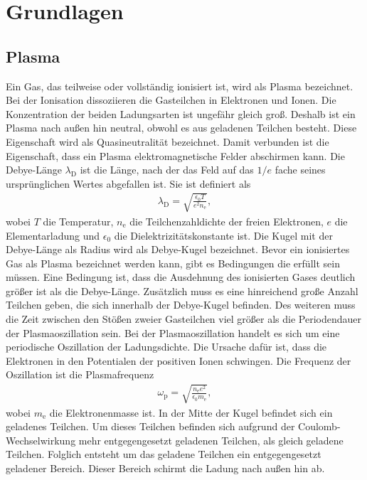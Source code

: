 \section{Grundlagen}
\subsection{Plasma}\label{sec:plasma}
Ein Gas, das teilweise oder vollständig ionisiert ist, wird als Plasma \cite{Plasmaphysik} bezeichnet. Bei der Ionisation dissoziieren die Gasteilchen in Elektronen und Ionen. Die Konzentration der beiden Ladungsarten ist ungefähr gleich groß. Deshalb ist ein Plasma nach außen hin neutral, obwohl es aus geladenen Teilchen besteht. Diese Eigenschaft wird als Quasineutralität bezeichnet. Damit verbunden ist die Eigenschaft, dass ein Plasma elektromagnetische Felder abschirmen kann.
Die Debye-Länge $\lambda_{\mathrm{D}}$ ist die Länge, nach der das Feld auf das $1/e$ fache seines ursprünglichen Wertes abgefallen ist. Sie ist definiert als
\begin{align}
\lambda_{\mathrm{D}}=\sqrt{\frac{\epsilon_0 T}{e^2 n_\mathrm{e}}},
\end{align}
wobei $T$ die Temperatur, $n_\mathrm{e}$ die Teilchenzahldichte der freien Elektronen, $e$ die Elementarladung und $\epsilon_0$ die Dielektrizitätskonstante ist.
Die Kugel mit der Debye-Länge als Radius wird als Debye-Kugel bezeichnet.
Bevor ein ionisiertes Gas als Plasma bezeichnet werden kann, gibt es Bedingungen die erfüllt sein müssen.  Eine Bedingung ist, dass die Ausdehnung des ionisierten Gases deutlich größer ist als die Debye-Länge. Zusätzlich muss es eine hinreichend große Anzahl Teilchen geben, die sich innerhalb der Debye-Kugel befinden. Des weiteren muss die Zeit zwischen den Stößen zweier Gasteilchen viel größer als die Periodendauer der Plasmaoszillation sein. Bei der Plasmaoszillation handelt es sich um eine periodische Oszillation der Ladungsdichte. Die Ursache dafür ist, dass die Elektronen in den Potentialen der positiven Ionen schwingen. Die Frequenz der Oszillation ist die Plasmafrequenz
\begin{align}
\omega_{\mathrm{p}}=\sqrt{\frac{n_{\mathrm{e}}e^2}{\epsilon_0 m_{\mathrm{e}}}},
\end{align}
wobei $m_{\mathrm{e}}$ die Elektronenmasse ist. 
In der Mitte der Kugel befindet sich ein geladenes Teilchen. Um dieses Teilchen befinden sich aufgrund der Coulomb-Wechselwirkung mehr entgegengesetzt geladenen Teilchen, als gleich geladene Teilchen. Folglich entsteht um das geladene Teilchen ein entgegengesetzt geladener Bereich. Dieser Bereich schirmt die Ladung nach außen hin ab.
